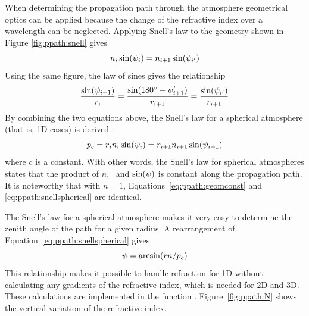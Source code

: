 When determining the propagation path through the atmosphere
geometrical optics can be applied because the change of the refractive
index over a wavelength can be neglected. Applying Snell's law
to the geometry shown in Figure
\ref{fig:ppath:snell} gives
\begin{equation}
  n_i \sin (\psi_{i}) = n_{i+1} \sin (\psi_{i'})
\end{equation}
Using the same figure, the law of sines gives the relationship
\begin{equation}
  \frac{\sin(\psi_{i+1})}{r_{i}} = 
  \frac{\sin(180^\circ-\psi_{i+1}')}{r_{i+1}} =
  \frac{\sin(\psi_{i'})}{r_{i+1}} 
\end{equation}
By combining the two equations above, the Snell's law for a spherical
atmosphere (that is, 1D cases) is derived
\citep[e.g.][]{kyle:91,balluch:97}:
\begin{equation}
  p_c = r_{i} n_i \sin(\psi_{i}) = r_{i+1} n_{i+1}\sin(\psi_{i+1}) 
 \label{eq:ppath:snellspherical}
\end{equation}
where $c$ is a constant. With other words, the Snell's law for
spherical atmospheres states that the product of $n$, \Rds\ and
$\sin(\psi)$ is constant along the propagation path. It is
noteworthy that with $n=1$, Equations~\ref{eq:ppath:geomconst} and
\ref{eq:ppath:snellspherical} are identical.

The Snell's law for a spherical atmosphere makes it very easy to
determine the zenith angle of the path for a given radius. A
rearrangement of Equation~\ref{eq:ppath:snellspherical} gives
\begin{equation}
  \psi = \arcsin( r n / p_c )
 \label{eq:ppath:za1D}
\end{equation}
This relationship makes it possible to handle refraction for 1D
without calculating any gradients of the refractive index, which is
needed for 2D and 3D. These calculations are implemented in the
function .
Figure~\ref{fig:ppath:N} shows the vertical variation of the
refractive index.





